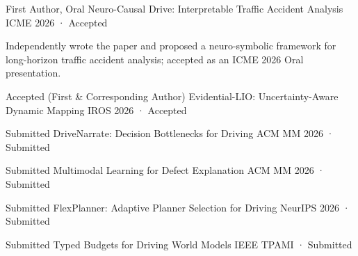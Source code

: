 
\begin{cventries}

  \cventry
    {First Author, Oral}
    {Neuro-Causal Drive: Interpretable Traffic Accident Analysis}
    {}
    {ICME 2026 · Accepted}
    {
      \begin{cvitems}
        \item {Independently wrote the paper and proposed a neuro-symbolic framework for long-horizon traffic accident analysis; accepted as an ICME 2026 Oral presentation.}
      \end{cvitems}
    }

  \cventry
    {Accepted (First \& Corresponding Author)}
    {Evidential-LIO: Uncertainty-Aware Dynamic Mapping}
    {}
    {IROS 2026 · Accepted}
    {}

  \cventry
    {Submitted}
    {DriveNarrate: Decision Bottlenecks for Driving}
    {}
    {ACM MM 2026 · Submitted}
    {}

  \cventry
    {Submitted}
    {Multimodal Learning for Defect Explanation}
    {}
    {ACM MM 2026 · Submitted}
    {}

  \cventry
    {Submitted}
    {FlexPlanner: Adaptive Planner Selection for Driving}
    {}
    {NeurIPS 2026 · Submitted}
    {}

  \cventry
    {Submitted}
    {Typed Budgets for Driving World Models}
    {}
    {IEEE TPAMI · Submitted}
    {}

\end{cventries}
